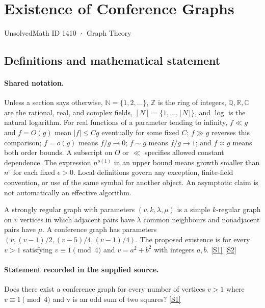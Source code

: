 \documentclass[11pt,a4paper]{article}
\newcommand{\N}{\mathbb{N}}
\newcommand{\Z}{\mathbb{Z}}
\newcommand{\Q}{\mathbb{Q}}
\newcommand{\R}{\mathbb{R}}
\newcommand{\C}{\mathbb{C}}
\newcommand{\sref}[2]{\hyperlink{source:#1:#2}{[S#2]}}
\begin{document}

\setcounter{section}{1409}

\section{Existence of Conference Graphs}\label{1410}

{\small\sffamily UnsolvedMath ID 1410 · Graph Theory}

\subsection{Definitions and mathematical statement}

\paragraph{Shared notation.}Unless a section says otherwise, $\N=\{1,2,\ldots\}$,
$\Z$ is the ring of integers, $\Q,\R,\C$ are the rational, real, and complex
fields, $[N]=\{1,\ldots,\lfloor N\rfloor\}$, and $\log$ is the natural
logarithm. For real functions of a parameter tending to infinity,
$f\ll g$ and $f=O(g)$ mean $|f|\leq Cg$ eventually for some fixed $C$;
$f\gg g$ reverses this comparison; $f=o(g)$ means $f/g\to0$;
$f\sim g$ means $f/g\to1$; and $f\asymp g$ means both order bounds.
A subscript on $O$ or $\ll$ specifies allowed constant dependence.
The expression $n^{o(1)}$ in an upper bound means growth smaller than
$n^\epsilon$ for each fixed $\epsilon>0$. Local definitions govern any
exception, finite-field convention, or use of the same symbol for another
object. An asymptotic claim is not automatically an effective algorithm.



A strongly regular graph with parameters $(v,k,\lambda,\mu)$ is a simple $k$-regular graph on $v$ vertices in which adjacent pairs have $\lambda$ common neighbours and nonadjacent pairs have $\mu$. A conference graph has parameters $(v,(v-1)/2,(v-5)/4,(v-1)/4)$. The proposed existence is for every $v>1$ satisfying $v\equiv1\pmod4$ and $v=a^2+b^2$ with integers $a,b$. \sref{1410}{1} \sref{1410}{2}

\paragraph{Statement recorded in the supplied source.}
Does there exist a conference graph for every number of vertices $v > 1$ where $v \equiv 1 \pmod{4}$ and v is an odd sum of two squares? \sref{1410}{1}
\end{document}
